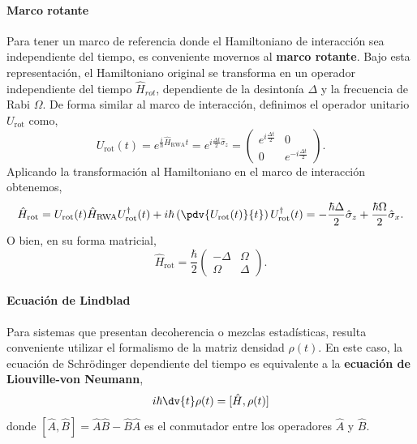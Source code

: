 \paragraph{Marco rotante}
Para tener un marco de referencia donde el Hamiltoniano de interacción sea independiente del tiempo, es conveniente movernos al \textbf{marco rotante}.  Bajo esta representación, el Hamiltoniano original se transforma en un operador independiente del tiempo $\hat{H}_{rot}$, dependiente de la desintonía $\Delta$ y la frecuencia de Rabi $\Omega$. De forma similar al marco de interacción, definimos el operador unitario $U_{\text{rot}}$ como,
\begin{equation}
    U_{\text{rot}}(t) = e^{\frac{i}{\hbar} \hat{H}_{\text{RWA}} t} = e^{i \frac{\Delta t}{2} \hat{\sigma}_z} = \begin{pmatrix}
    e^{i \frac{\Delta t}{2}} & 0 \\
    0 & e^{-i \frac{\Delta t}{2}}
    \end{pmatrix}.
\end{equation}
Aplicando la transformación al Hamiltoniano en el marco de interacción obtenemos,
\begin{equation}
\begin{split}
    \hat{H}_{\text{rot}} = U_{\text{rot}}(t) \hat{H}_{\text{RWA}} U_{\text{rot}}^{\dagger}(t) + i \hbar \left(\pdv{U_{\text{rot}}(t)}{t}\right) U_{\text{rot}}^{\dagger}(t)
    = -\frac{\hbar \Delta}{2} \hat{\sigma}_z + \frac{\hbar \Omega}{2} \hat{\sigma}_x.
\end{split}
\end{equation}
O bien, en su forma matricial,
\begin{equation}
\boxed{
\hat{H}_{\text{rot}} =\frac{\hbar}{2} \begin{pmatrix}
    -\Delta & \Omega \\
    \Omega & \Delta
    \end{pmatrix}.
}
\end{equation}

\paragraph{Ecuación de Lindblad}
Para sistemas que presentan decoherencia o mezclas estadísticas, resulta conveniente utilizar el formalismo de la matriz densidad $\rho(t)$. En este caso, la ecuación de Schrödinger dependiente del tiempo es equivalente a la \textbf{ecuación de Liouville-von Neumann},
\begin{equation}
    i \hbar \dv{t} \rho(t) = [\hat{H}, \rho(t)]
\end{equation}
donde $[\hat{A}, \hat{B}] = \hat{A} \hat{B} - \hat{B} \hat{A}$ es el conmutador entre los operadores $\hat{A}$ y $\hat{B}$.

